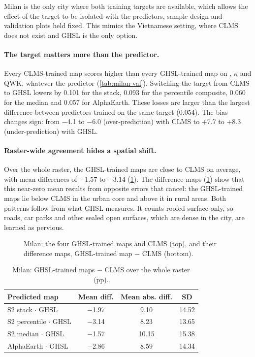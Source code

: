 Milan is the only city where both training targets are available, which
allows the effect of the target to be isolated with the predictors, sample
design and validation plots held fixed. This mimics the Vietnamese setting,
where CLMS does not exist and GHSL is the only option.

\paragraph{The target matters more than the predictor.} Every CLMS-trained
map scores higher than every GHSL-trained map on \Rsq, $\kappa$ and QWK,
whatever the predictor (\cref{tab:milan-val}). Switching the target from
CLMS to GHSL lowers \Rsq{} by 0.101 for the stack, 0.093 for the percentile
composite, 0.060 for the median and 0.057 for AlphaEarth. These losses are
larger than the largest difference between predictors trained on the same
target (0.054). The bias changes sign: from $-$4.1 to $-$6.0\pp{}
(over-prediction) with CLMS to +7.7 to +8.3\pp{} (under-prediction) with
GHSL.

\paragraph{Raster-wide agreement hides a spatial shift.} Over the whole
raster, the GHSL-trained maps are close to CLMS on average, with mean
differences of $-$1.57 to $-$3.14\pp{} (\cref{tab:ghsl-clms}). The
difference maps (\cref{fig:ghsl-clms}) show that this near-zero mean
results from opposite errors that cancel: the GHSL-trained maps lie below
CLMS in the urban core and above it in rural areas. Both patterns follow
from what GHSL measures. It counts roofed surface only, so roads, car parks
and other sealed open surfaces, which are dense in the city, are learned as
pervious.

\begin{figure}[htbp]
  \centering
  \caption{Milan: the four GHSL-trained maps and CLMS (top), and their
  difference maps, GHSL-trained map $-$ CLMS (bottom).}
  \label{fig:ghsl-clms}
\end{figure}

\begin{table}[htbp]
  \centering
  \small
  \caption{Milan: GHSL-trained maps $-$ CLMS over the whole raster (pp).}
  \label{tab:ghsl-clms}
  \begin{tabular}{lccc}
    \toprule
    Predicted map & Mean diff. & Mean abs. diff. & SD \\
    \midrule
    S2 stack $\cdot$ GHSL      & $-$1.97 & 9.10 & 14.52 \\
    S2 percentile $\cdot$ GHSL & $-$3.14 & 8.23 & 13.65 \\
    S2 median $\cdot$ GHSL     & $-$1.57 & 10.15 & 15.38 \\
    AlphaEarth $\cdot$ GHSL    & $-$2.86 & 8.59 & 14.34 \\
    \bottomrule
  \end{tabular}
\end{table}

